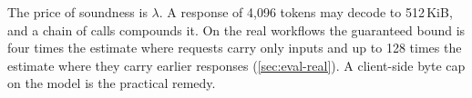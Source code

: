 The price of soundness is $\lambda$. A response of 4,096 tokens may decode to
512\,KiB, and a chain of calls compounds it. On the real workflows the guaranteed
bound is four times the estimate where requests carry only inputs and up to 128 times
the estimate where they carry earlier responses (\cref{sec:eval-real}). A client-side
byte cap on the model is the practical remedy.
